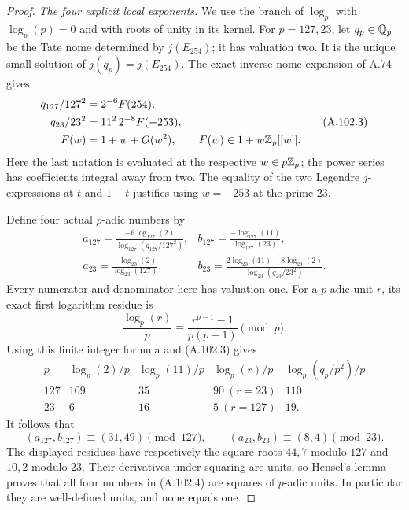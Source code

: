\begin{proof}
\emph{The four explicit local exponents.}
We use the branch of $\log_p$ with $\log_p(p)=0$ and
with roots of unity in its kernel.
For $p=127,23$, let $q_p\in\mathbb Q_p$ be the Tate nome
determined by $j(E_{254})$; it has valuation two.
It is the unique small solution of
$j(q_p)=j(E_{254})$.
The exact inverse-nome expansion of A.74 gives
\[
 \begin{split}
       q_{127}/127^2&=2^{-6}F(254),\\
       q_{23}/23^2&=11^2\,2^{-8}F(-253),\\
       F(w)&=1+w+O(w^2),\qquad
                     F(w)\in1+w\mathbb Z_p[[w]].
 \end{split}
\tag{A.102.3}
\]
Here the last notation is evaluated at the respective
$w\in p\mathbb Z_p$; the power series has coefficients integral
away from two.  The equality of the two Legendre
$j$-expressions at $t$ and $1-t$ justifies using
$w=-253$ at the prime $23$.

Define four actual $p$-adic numbers by
\[
 \begin{array}{ll}
 a_{127}=\displaystyle
       \frac{-6\log_{127}(2)}{\log_{127}(q_{127}/127^2)},
 &b_{127}=\displaystyle
       \frac{-\log_{127}(11)}{\log_{127}(23)},\\[8pt]
 a_{23}=\displaystyle
       \frac{-\log_{23}(2)}{\log_{23}(127)},
 &b_{23}=\displaystyle
       \frac{2\log_{23}(11)-8\log_{23}(2)}
                         {\log_{23}(q_{23}/23^2)}.
 \end{array}
\tag{A.102.4}
\]
Every numerator and denominator here has valuation one.
For a $p$-adic unit $r$, its exact first logarithm residue is
\[
       \frac{\log_p(r)}p\equiv
          \frac{r^{p-1}-1}{p(p-1)}\pmod p.
\tag{A.102.5}
\]
Using this finite integer formula and (A.102.3) gives
\[
\begin{array}{c|rrrr}
 p&\log_p(2)/p&\log_p(11)/p&
            \log_p(r)/p&\log_p(q_p/p^2)/p\\ \hline
 127&109&35&90\ (r=23)&110\\
 23&6&16&5\ (r=127)&19.
\end{array}
\tag{A.102.6}
\]
It follows that
\[
        (a_{127},b_{127})\equiv(31,49)\pmod{127},
          \qquad (a_{23},b_{23})\equiv(8,4)\pmod{23}.
\tag{A.102.7}
\]
The displayed residues have respectively the square roots
$44,7$ modulo $127$ and $10,2$ modulo $23$.
Their derivatives under squaring are units, so Hensel's
lemma proves that all four numbers in (A.102.4) are
squares of $p$-adic units.  In particular they are
well-defined units, and none equals one.


\end{proof}
